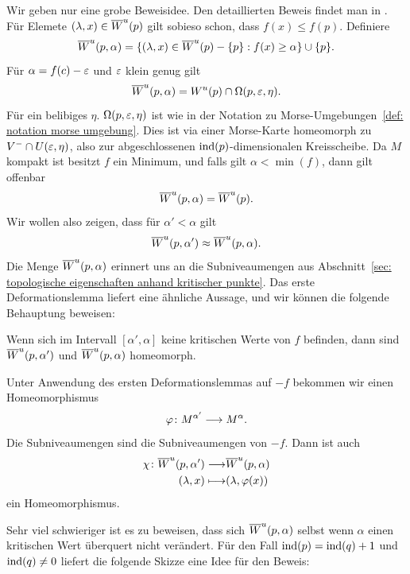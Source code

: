 \begin{bigproof}
    Wir geben nur eine grobe Beweisidee. Den detaillierten Beweis findet man in \cite{audin}.
    Für Elemete $(\lambda, x) \in { \overline{W}^u } (p)$ gilt sobieso schon, dass $f(x) \leq f(p)$. Definiere
    \[ { \overline{W}^u } (p, \alpha) = 
        \{ (\lambda, x) \in { \overline{W}^u } (p) - \{ p \} : f(x) \geq \alpha \}  \cup \{ p \} . \]
    Für $\alpha = f(c) - \varepsilon$ und $\varepsilon$ klein genug gilt 
    \[ { \overline{W}^u } (p, \alpha) = { W^u } (p) \cap \Omega (p, \varepsilon, \eta) . \]
    Für ein belibiges $\eta$. $\Omega (p, \varepsilon, \eta)$ ist wie in der Notation zu 
    Morse-Umgebungen~\ref{def: notation morse umgebung}. Dies ist via einer Morse-Karte homeomorph 
    zu $V^- \cap U(\varepsilon, \eta)$, also zur abgeschlossenen ${ \operatorname{ind} } (p)$-dimensionalen Kreisscheibe.
    Da $M$ kompakt ist besitzt $f$ ein Minimum, und falls gilt $\alpha < \min (f)$, dann gilt 
    offenbar
    \[ { \overline{W}^u } (p, \alpha) = { \overline{W}^u } (p) . \]
    Wir wollen also zeigen, dass für $\alpha' < \alpha$ gilt
    \[ { \overline{W}^u } (p, \alpha') \approx { \overline{W}^u } (p, \alpha) . \]
    Die Menge ${ \overline{W}^u } (p, \alpha)$ erinnert uns an die Subniveaumengen aus 
    Abschnitt~\ref{sec: topologische eigenschaften anhand kritischer punkte}. Das erste 
    Deformationslemma liefert eine ähnliche Aussage, und wir können die folgende Behauptung 
    beweisen:

    \begin{claim}
        Wenn sich im Intervall $[\alpha', \alpha]$ keine kritischen Werte von $f$
        befinden, dann sind ${ \overline{W}^u } (p, \alpha')$ und ${ \overline{W}^u } (p, \alpha)$ homeomorph.
    \end{claim}

    \begin{smallproof}
        Unter Anwendung des ersten Deformationslemmas auf $-f$ bekommen wir einen Homeomorphismus
        \[ \varphi \colon M^{\alpha'} \longrightarrow M^{\alpha} . \]
        Die Subniveaumengen sind die Subniveaumengen von $-f$. Dann ist auch 
        \begin{align*}
            \chi \colon { \overline{W}^u } (p, \alpha') \longrightarrow & { \overline{W}^u } (p, \alpha) \\
            (\lambda, x) \longmapsto & (\lambda, \varphi(x))
        \end{align*}
        ein Homeomorphismus.
    \end{smallproof}

    Sehr viel schwieriger ist es zu beweisen, dass sich ${ \overline{W}^u } (p, \alpha)$ selbst wenn $\alpha$
    einen kritischen Wert überquert nicht verändert. Für den Fall ${ \operatorname{ind} } (p) = { \operatorname{ind} } (q) + 1$
    und ${ \operatorname{ind} } (q) \neq 0$ liefert die folgende Skizze eine Idee für den Beweis:


\end{bigproof}
